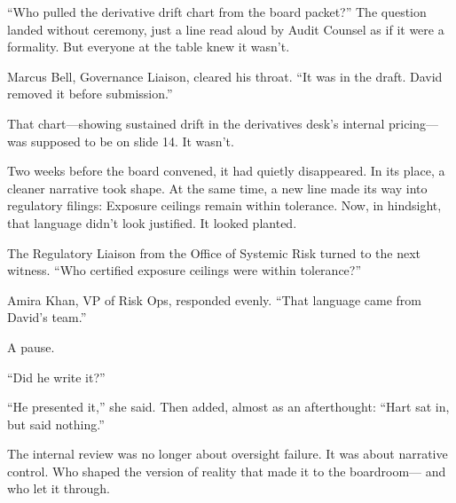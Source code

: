   \medskip

“Who pulled the derivative drift chart from the board packet?”
The question landed without ceremony, just a line read aloud by Audit Counsel as if it were a formality.
But everyone at the table knew it wasn’t.

Marcus Bell, Governance Liaison, cleared his throat.
“It was in the draft. David removed it before submission.”

That chart—showing sustained drift in the derivatives desk’s internal pricing—was supposed to be on slide 14.
It wasn’t.

Two weeks before the board convened, it had quietly disappeared.
In its place, a cleaner narrative took shape.
At the same time, a new line made its way into regulatory filings:
Exposure ceilings remain within tolerance.
Now, in hindsight, that language didn’t look justified.
It looked planted.

The Regulatory Liaison from the Office of Systemic Risk turned to the next witness.
“Who certified exposure ceilings were within tolerance?”

Amira Khan, VP of Risk Ops, responded evenly.
“That language came from David’s team.”

A pause.

“Did he write it?”

“He presented it,” she said.
Then added, almost as an afterthought:
“Hart sat in, but said nothing.”

The internal review was no longer about oversight failure.
It was about narrative control.
Who shaped the version of reality that made it to the boardroom—
and who let it through.

\medskip

